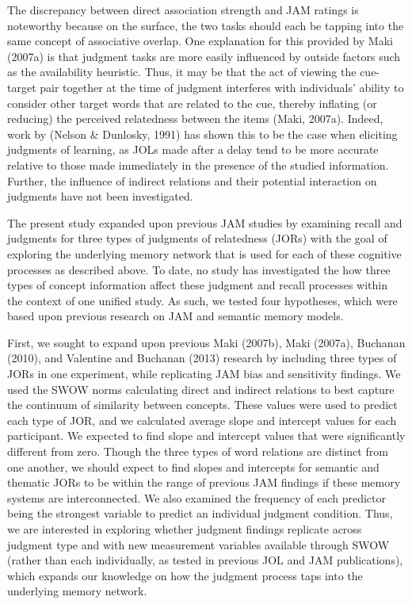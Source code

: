 \documentclass[english,,man]{apa6}
\begin{document}
The discrepancy between direct association strength and JAM ratings is noteworthy because on the surface, the two tasks should each be tapping into the same concept of associative overlap. One explanation for this provided by Maki (2007a) is that judgment tasks are more easily influenced by outside factors such as the availability heuristic. Thus, it may be that the act of viewing the cue-target pair together at the time of judgment interferes with individuals' ability to consider other target words that are related to the cue, thereby inflating (or reducing) the perceived relatedness between the items (Maki, 2007a). Indeed, work by (Nelson \& Dunlosky, 1991) has shown this to be the case when eliciting judgments of learning, as JOLs made after a delay tend to be more accurate relative to those made immediately in the presence of the studied information. Further, the influence of indirect relations and their potential interaction on judgments have not been investigated.

The present study expanded upon previous JAM studies by examining recall and judgments for three types of judgments of relatedness (JORs) with the goal of exploring the underlying memory network that is used for each of these cognitive processes as described above. To date, no study has investigated the how three types of concept information affect these judgment and recall processes within the context of one unified study. As such, we tested four hypotheses, which were based upon previous research on JAM and semantic memory models.

First, we sought to expand upon previous Maki (2007b), Maki (2007a), Buchanan (2010), and Valentine and Buchanan (2013) research by including three types of JORs in one experiment, while replicating JAM bias and sensitivity findings. We used the SWOW norms calculating direct and indirect relations to best capture the continuum of similarity between concepts. These values were used to predict each type of JOR, and we calculated average slope and intercept values for each participant. We expected to find slope and intercept values that were significantly different from zero. Though the three types of word relations are distinct from one another, we should expect to find slopes and intercepts for semantic and thematic JORs to be within the range of previous JAM findings if these memory systems are interconnected. We also examined the frequency of each predictor being the strongest variable to predict an individual judgment condition. Thus, we are interested in exploring whether judgment findings replicate across judgment type and with new measurement variables available through SWOW (rather than each individually, as tested in previous JOL and JAM publications), which expands our knowledge on how the judgment process taps into the underlying memory network.
\end{document}

